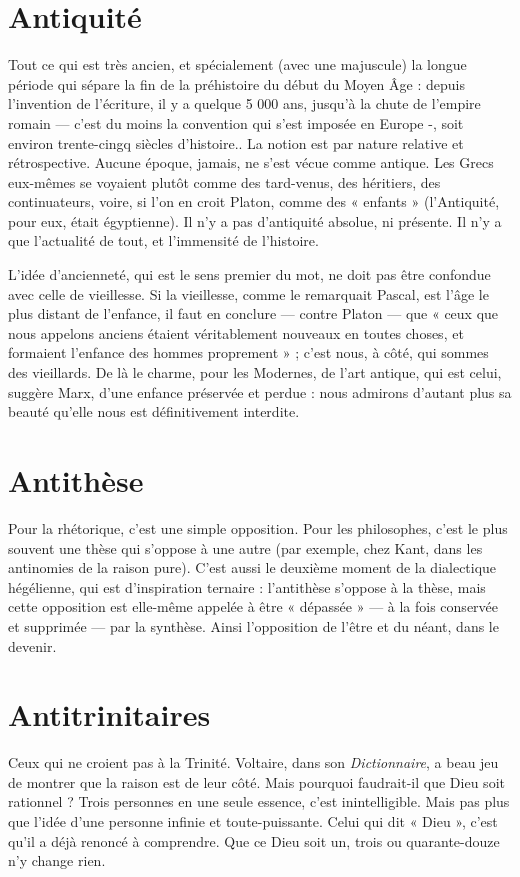 \section{Antiquité}
Tout ce qui est très ancien, et spécialement (avec une majuscule)
la longue période qui sépare la fin de la préhistoire
du début du Moyen Âge : depuis l’invention de l'écriture, il y a quelque
5 000 ans, jusqu’à la chute de l’empire romain — c’est du moins la convention
qui s’est imposée en Europe -, soit environ trente-cingq siècles d’histoire.. La
notion est par nature relative et rétrospective. Aucune époque, jamais, ne s’est
vécue comme antique. Les Grecs eux-mêmes se voyaient plutôt comme des
tard-venus, des héritiers, des continuateurs, voire, si l’on en croit Platon,
comme des « enfants » (l’Antiquité, pour eux, était égyptienne). Il n’y a pas
d’antiquité absolue, ni présente. Il n’y a que l'actualité de tout, et l’immensité
de l’histoire.

L'idée d’ancienneté, qui est le sens premier du mot, ne doit pas être confondue
avec celle de vieillesse. Si la vieillesse, comme le remarquait Pascal,
est l’âge le plus distant de l'enfance, il faut en conclure — contre Platon — que
« ceux que nous appelons anciens étaient véritablement nouveaux en toutes
choses, et formaient l'enfance des hommes proprement » ; c’est nous, à côté,
qui sommes des vieillards. De là le charme, pour les Modernes, de l’art
antique, qui est celui, suggère Marx, d’une enfance préservée et perdue :
nous admirons d’autant plus sa beauté qu’elle nous est définitivement interdite.

\section{Antithèse}
Pour la rhétorique, c’est une simple opposition. Pour les philosophes,
c’est le plus souvent une thèse qui s'oppose à une
autre (par exemple, chez Kant, dans les antinomies de la raison pure). C’est
aussi le deuxième moment de la dialectique hégélienne, qui est d'inspiration
ternaire : l’antithèse s'oppose à la thèse, mais cette opposition est elle-même
appelée à être « dépassée » — à la fois conservée et supprimée — par la synthèse.
Ainsi l’opposition de l’être et du néant, dans le devenir.

\section{Antitrinitaires}
Ceux qui ne croient pas à la Trinité. Voltaire, dans son
{\it Dictionnaire}, a beau jeu de montrer que la raison est de
leur côté. Mais pourquoi faudrait-il que Dieu soit rationnel ? Trois personnes
en une seule essence, c’est inintelligible. Mais pas plus que l’idée d’une personne
infinie et toute-puissante. Celui qui dit « Dieu », c’est qu’il a déjà renoncé à comprendre.
Que ce Dieu soit un, trois ou quarante-douze n’y change rien.

